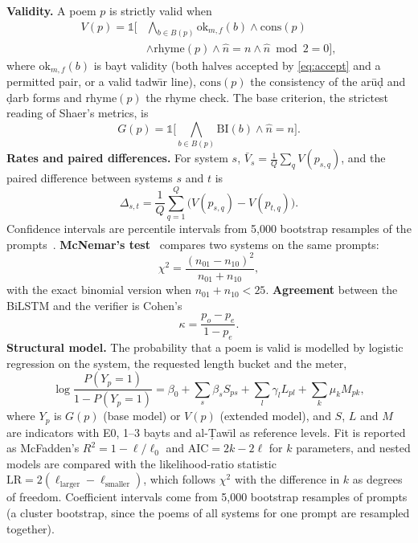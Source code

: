 \textbf{Validity.} A poem $p$ is strictly valid when
\begin{equation}
\begin{split}
V(p) = \mathbb{1}\Big[&\textstyle\bigwedge_{b \in B(p)} \mathrm{ok}_{m,f}(b) \wedge \mathrm{cons}(p) \\
&\wedge \mathrm{rhyme}(p) \wedge \hat{n} = n \wedge \hat{n} \bmod 2 = 0\Big],
\end{split}
\label{eq:strict}
\end{equation}
where $\mathrm{ok}_{m,f}(b)$ is bayt validity (both halves accepted by \eqref{eq:accept} and a permitted pair, or a
valid tadw\={\i}r line), $\mathrm{cons}(p)$ the consistency of the \textquotesingle ar\=u\d{d} and \d{d}arb forms and
$\mathrm{rhyme}(p)$ the rhyme check. The base criterion, the strictest reading of Shaer's metrics, is
\begin{equation}
G(p) = \mathbb{1}\Big[\textstyle\bigwedge_{b \in B(p)} \mathrm{BI}(b) \wedge \hat{n} = n\Big].
\label{eq:base}
\end{equation}
\textbf{Rates and paired differences.} For system $s$, $\bar{V}_s = \frac{1}{Q}\sum_{q} V(p_{s,q})$, and the paired
difference between systems $s$ and $t$ is
\begin{equation}
\Delta_{s,t} = \frac{1}{Q}\sum_{q=1}^{Q}\big(V(p_{s,q}) - V(p_{t,q})\big).
\label{eq:delta}
\end{equation}
Confidence intervals are percentile intervals from 5,000 bootstrap resamples of the prompts~\cite{efron1979bootstrap}.
\textbf{McNemar's test}~\cite{mcnemar1947note} compares two systems on the same prompts:
\begin{equation}
\chi^2 = \frac{(n_{01} - n_{10})^2}{n_{01} + n_{10}},
\label{eq:mcnemar}
\end{equation}
with the exact binomial version when $n_{01}+n_{10} < 25$. \textbf{Agreement} between the BiLSTM and the verifier is
Cohen's~\cite{cohen1960kappa}
\begin{equation}
\kappa = \frac{p_o - p_e}{1 - p_e}.
\label{eq:kappa}
\end{equation}
\textbf{Structural model.} The probability that a poem is valid is modelled by logistic regression on the system,
the requested length bucket and the meter,
\begin{equation}
\log\frac{P(Y_p = 1)}{1 - P(Y_p = 1)} = \beta_0 + \sum_{s}\beta_s S_{ps} + \sum_{l}\gamma_l L_{pl} + \sum_{k}\mu_k M_{pk},
\label{eq:logit}
\end{equation}
where $Y_p$ is $G(p)$ (base model) or $V(p)$ (extended model), and $S$, $L$ and $M$ are indicators with E0, 1--3
bayts and al-\d{T}aw\={\i}l as reference levels. Fit is reported as McFadden's $R^2 = 1 - \ell/\ell_0$ and
$\mathrm{AIC} = 2k - 2\ell$ for $k$ parameters, and nested models are compared with the likelihood-ratio statistic
$\mathrm{LR} = 2(\ell_{\text{larger}} - \ell_{\text{smaller}})$, which follows $\chi^2$ with the difference in $k$ as
degrees of freedom. Coefficient intervals come from 5,000 bootstrap resamples of prompts (a cluster bootstrap, since the
poems of all systems for one prompt are resampled together).

